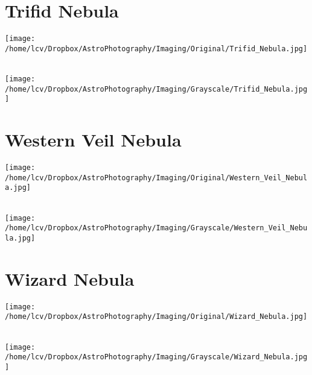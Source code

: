 \section{Trifid Nebula}
\texttt{[image: /home/lcv/Dropbox/AstroPhotography/Imaging/Original/Trifid\_Nebula.jpg]}
{\footnotesize\color{white}

}\ \\
\texttt{[image: /home/lcv/Dropbox/AstroPhotography/Imaging/Grayscale/Trifid\_Nebula.jpg]}
\section{Western Veil Nebula}
\texttt{[image: /home/lcv/Dropbox/AstroPhotography/Imaging/Original/Western\_Veil\_Nebula.jpg]}
{\footnotesize\color{white}

}\ \\
\texttt{[image: /home/lcv/Dropbox/AstroPhotography/Imaging/Grayscale/Western\_Veil\_Nebula.jpg]}
\section{Wizard Nebula}
\texttt{[image: /home/lcv/Dropbox/AstroPhotography/Imaging/Original/Wizard\_Nebula.jpg]}
{\footnotesize\color{white}

}\ \\
\texttt{[image: /home/lcv/Dropbox/AstroPhotography/Imaging/Grayscale/Wizard\_Nebula.jpg]}

